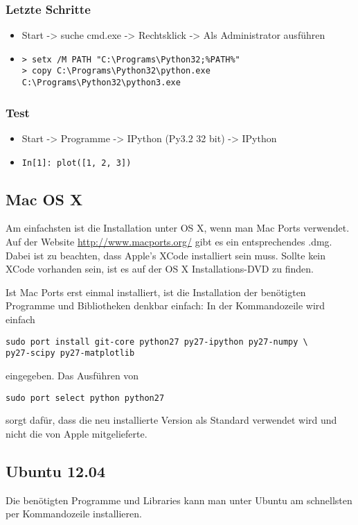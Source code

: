 \subsubsection{Letzte Schritte}
\begin{itemize}
  \item Start -> suche cmd.exe -> Rechtsklick -> Als Administrator ausführen
  \item
\begin{verbatim}
> setx /M PATH "C:\Programs\Python32;%PATH%"
> copy C:\Programs\Python32\python.exe C:\Programs\Python32\python3.exe
\end{verbatim}
\end{itemize}

\subsubsection{Test}
\begin{itemize}
  \item Start -> Programme -> IPython (Py3.2 32 bit) -> IPython
  \item \texttt{In[1]: plot([1, 2, 3])}
\end{itemize}

\subsection{Mac OS X}
Am einfachsten ist die Installation unter OS X, wenn man Mac Ports verwendet.
Auf der Website \url{http://www.macports.org/} gibt es ein entsprechendes .dmg.
Dabei ist zu beachten, dass Apple's XCode installiert sein muss.
Sollte kein XCode vorhanden sein, ist es auf der OS X Installations-DVD zu finden.

Ist Mac Ports erst einmal installiert, ist die Installation der benötigten Programme und Bibliotheken denkbar einfach: In der Kommandozeile wird einfach
\begin{verbatim}
sudo port install git-core python27 py27-ipython py27-numpy \
py27-scipy py27-matplotlib
\end{verbatim}
eingegeben.
Das Ausführen von
\begin{verbatim}
sudo port select python python27
\end{verbatim}
sorgt dafür, dass die neu installierte Version als Standard verwendet wird und nicht die von Apple mitgelieferte.

\subsection{Ubuntu 12.04}
Die benötigten Programme und Libraries kann man unter Ubuntu am schnellsten per Kommandozeile installieren.

